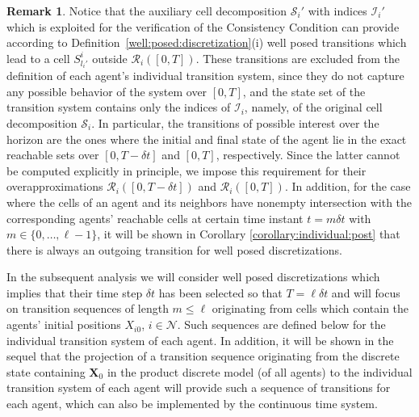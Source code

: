\documentclass[reqno]{amsart}
\theoremstyle{plain}
\theoremstyle{definition}
\newtheorem{rem}[thm]{Remark}
\numberwithin{equation}{section}
\begin{document}
\begin{rem}
Notice that the auxiliary cell decomposition ${\ensuremath{\mathcal{S}}}_i'$ with indices ${\ensuremath{\mathcal{I}}}_i'$ which is exploited for the verification of the Consistency Condition can provide according to Definition~\ref{well:posed:discretization}(i) well posed transitions which lead to a cell $S_{l_i'}^i$ outside ${\ensuremath{\mathcal{R}}}_i([0,T])$. These transitions are excluded from the definition of each agent's individual transition system, since they do not capture any possible behavior of the system over $[0,T]$, and the state set of the transition system contains only the indices of ${\ensuremath{\mathcal{I}}}_i$, namely, of the original cell decomposition ${\ensuremath{\mathcal{S}}}_i$. In particular, the transitions of possible interest over the horizon are the ones where the initial and final state of the agent lie in the exact reachable sets over $[0,T-\delta t]$ and $[0,T]$, respectively. Since the latter cannot be computed explicitly in principle, we impose this requirement for their overapproximations ${\ensuremath{\mathcal{R}}}_i([0,T-\delta t])$ and ${\ensuremath{\mathcal{R}}}_i([0,T])$. 
In addition, for the case where the cells of an agent and its neighbors have nonempty intersection with the corresponding agents' reachable cells at certain time instant $t=m\delta t$ with $m\in\{0,\ldots,\ell-1\}$, it will be shown in Corollary \ref{corollary:individual:post} that there is always an outgoing transition for well posed discretizations. 
\end{rem}

In the subsequent analysis we will consider well posed discretizations which implies that their time step $\delta t$ has been selected so that $T=\ell\delta t$ and will focus on transition sequences of length $m\le\ell$ originating from cells which contain the agents' initial positions $X_{i0}$, $i\in{\ensuremath{\mathcal{N}}}$. 
Such sequences are defined below for the individual transition system of each agent. In addition, it will be shown in the sequel that the projection of a transition sequence originating from the discrete state containing ${\textbf{{X}}}_0$ in the product discrete model (of all agents) to the individual transition system of each agent will provide such a sequence of transitions for each agent, which can also be implemented by the continuous time system. 
\end{document}
